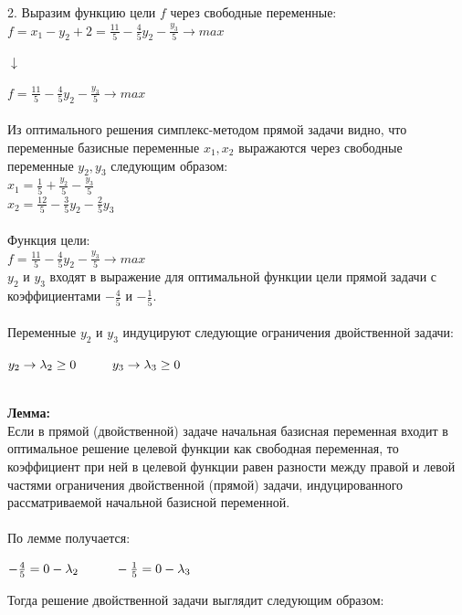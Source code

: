 \documentclass[14pt,a4paper,fleqn]{extarticle}
\begin{document}
2. Выразим функцию цели $f$ через свободные переменные:\\
$f = x_1 - y_2 + 2 = \frac{11}{5} - \frac{4}{5}y_2 - \frac{y_3}{5} \longrightarrow max$
\begin{center}$\downarrow$\end{center}
$f = \frac{11}{5} - \frac{4}{5}y_2 - \frac{y_3}{5} \longrightarrow max$\\
\noindent\makebox[\linewidth]{\rule{\paperwidth}{0.4pt}}\\
Из оптимального решения симплекс-методом прямой задачи видно, что переменные базисные переменные $x_1, x_2$ выражаются через свободные переменные $y_2, y_3$ следующим образом:\\
$x_1 = \frac{1}{5} + \frac{y_2}{5} - \frac{y_3}{5}$\\
$x_2 = \frac{12}{5} - \frac{3}{5}y_2 - \frac{2}{5}y_3$\\\\
Функция цели:\\
$f = \frac{11}{5} - \frac{4}{5}y_2 - \frac{y_3}{5} \longrightarrow max$\\
$y_2$ и $y_3$ входят в выражение для оптимальной функции цели прямой задачи с коэффициентами $-\frac{4}{5}$ и $-\frac{1}{5}$.\\\\
Переменные $y_2$ и $y_3$ индуцируют следующие ограничения двойственной задачи:
\begin{center}
$y_2 \rightarrow \lambda_2 \geq 0 \hspace*{1cm} y_3 \rightarrow \lambda_3 \geq 0$
\end{center}
\noindent\makebox[\linewidth]{\rule{\paperwidth}{0.4pt}}\\
\textbf{Лемма:}\\
Если  в  прямой  (двойственной)  задаче  начальная 
базисная переменная входит в оптимальное решение целевой 
функции  как  свободная  переменная,  то  коэффициент  при  ней  в 
целевой  функции  равен  разности  между  правой  и  левой  частями 
ограничения двойственной (прямой) задачи, индуцированного 
рассматриваемой начальной базисной переменной.\\
\noindent\makebox[\linewidth]{\rule{\paperwidth}{0.4pt}}\\
По лемме получается:
\begin{center}
$-\frac{4}{5} = 0 - \lambda_2 \hspace*{1cm} -\frac{1}{5} = 0 - \lambda_3$
\end{center}
Тогда решение двойственной задачи выглядит следующим образом:\\
\end{document}
